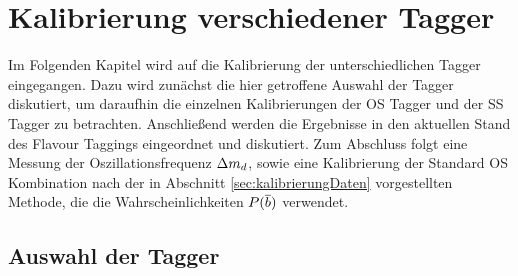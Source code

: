 \chapter{Kalibrierung verschiedener Tagger}

Im Folgenden Kapitel wird auf die Kalibrierung der unterschiedlichen Tagger eingegangen. Dazu wird zunächst die hier getroffene Auswahl der Tagger diskutiert, um daraufhin die einzelnen Kalibrierungen der OS Tagger und der SS Tagger zu betrachten. Anschließend werden die Ergebnisse in den aktuellen Stand des Flavour Taggings eingeordnet und diskutiert.  Zum Abschluss folgt eine Messung der Oszillationsfrequenz ${\Delta m_{{d}}}$, sowie eine Kalibrierung der Standard OS Kombination nach der in Abschnitt \ref{sec:kalibrierungDaten} vorgestellten Methode, die die Wahrscheinlichkeiten $P({\overline {{b}}})$ verwendet.

\section{Auswahl der Tagger}

